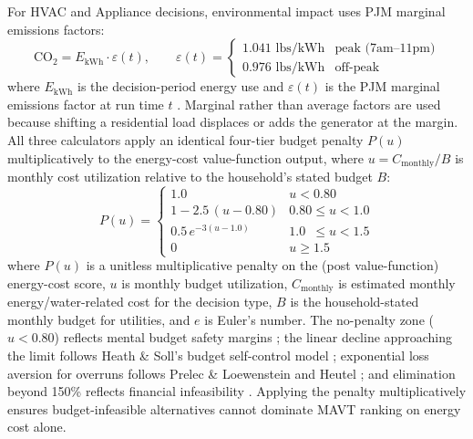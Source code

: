 \documentclass[final,3p,times]{elsarticle}
\begin{document}
For HVAC and Appliance decisions, environmental impact uses PJM marginal emissions factors:
\begin{equation}
  \mathrm{CO_2} = E_{\mathrm{kWh}} \cdot \varepsilon(t), \qquad
  \varepsilon(t) = \begin{cases}
    1.041 \text{ lbs/kWh} & \text{peak (7am--11pm)} \\
    0.976 \text{ lbs/kWh} & \text{off-peak}
  \end{cases}
  \label{eq:emissions}
\end{equation}
\noindent where $E_{\mathrm{kWh}}$ is the decision-period energy use and $\varepsilon(t)$ is
the PJM marginal emissions factor at run time $t$ \cite{pjm2022emissions}. Marginal rather
than average factors are used because shifting a residential load displaces or adds the
generator at the margin.
All three calculators apply an identical four-tier budget penalty $P(u)$ multiplicatively to
the energy-cost value-function output, where $u = C_{\mathrm{monthly}} / B$ is monthly cost
utilization relative to the household's stated budget $B$:
\begin{equation}
  P(u) = \begin{cases}
    1.0                          & u < 0.80                   \\[4pt]
    1 - 2.5\,(u - 0.80)         & 0.80 \le u < 1.0           \\[4pt]
    0.5\,e^{-3(u - 1.0)}        & 1.0 \phantom{0}\le u < 1.5 \\[4pt]
    0                            & u \ge 1.5
  \end{cases}
  \label{eq:budget_penalty}
\end{equation}
\noindent where $P(u)$ is a unitless multiplicative penalty on the (post value-function) energy-cost score,
$u$ is monthly budget utilization, $C_{\mathrm{monthly}}$ is estimated monthly energy/water-related cost for the decision type,
$B$ is the household-stated monthly budget for utilities, and $e$ is Euler's number.
The no-penalty zone ($u < 0.80$) reflects mental budget safety margins
\cite{thaler1999}; the linear decline approaching the limit follows Heath \& Soll's
budget self-control model \cite{heath1996}; exponential loss aversion for overruns
follows Prelec \& Loewenstein \cite{prelec1998} and Heutel \cite{heutel2017}; and
elimination beyond 150\% reflects financial infeasibility \cite{gathergood2012}.
Applying the penalty multiplicatively ensures budget-infeasible alternatives cannot
dominate MAVT ranking on energy cost alone.
\end{document}
